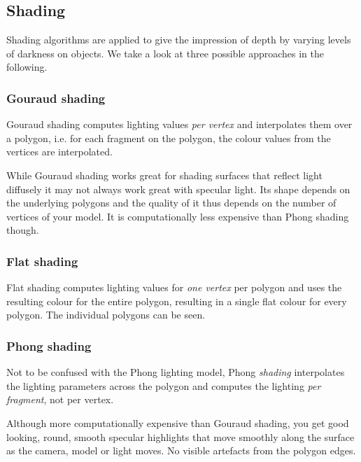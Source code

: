 \documentclass[english]{panikzettel}
\begin{document}
\begin{halfboxl}
\subsection{Shading}
Shading algorithms are applied to give the impression of depth by varying levels of darkness on objects. We take a look at three possible approaches in the following.

\subsubsection*{Gouraud shading}
Gouraud shading computes lighting values \emph{per vertex} and interpolates them over a polygon, i.e. for each fragment on the polygon, the colour values from the vertices are interpolated.

While Gouraud shading works great for shading surfaces that reflect light diffusely it may not always work great with specular light. Its shape depends on the underlying polygons and the quality of it thus depends on the number of vertices of your model. It is computationally less expensive than Phong shading though.
\end{halfboxl}%
\begin{halfboxr}
\subsubsection*{Flat shading}
Flat shading computes lighting values for \emph{one vertex} per polygon and uses the resulting colour for the entire polygon, resulting in a single flat colour for every polygon. The individual polygons can be seen.

\subsubsection*{Phong shading}
Not to be confused with the Phong lighting model, Phong \emph{shading} interpolates the lighting parameters across the polygon and computes the lighting \emph{per fragment}, not per vertex.

Although more computationally expensive than Gouraud shading, you get good looking, round, smooth specular highlights that move smoothly along the surface as the camera, model or light moves. No visible artefacts from the polygon edges.
\end{halfboxr}
\end{document}
